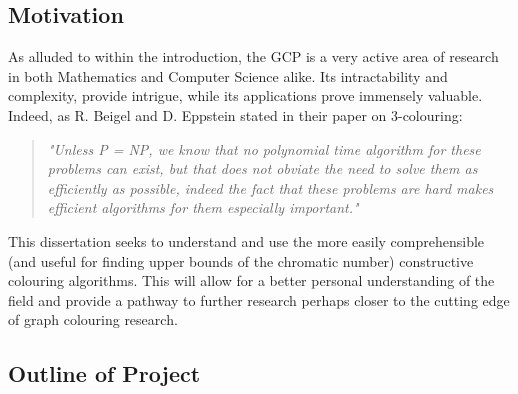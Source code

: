 \subsection{Motivation}
As alluded to within the introduction, the GCP is a very active area of research in both Mathematics and Computer Science alike. Its intractability and complexity, provide intrigue, while its applications prove immensely valuable. Indeed, as R. Beigel and D. Eppstein stated in their paper on 3-colouring: 
\begin{quote}
    \textit{"Unless P = NP, we know that no polynomial time algorithm for these problems can exist, but that does not obviate the need to solve them as efficiently as possible, indeed the fact that these problems are hard makes efficient algorithms for them especially important."}\cite{BEIGEL2005168}
\end{quote}
This dissertation seeks to understand and use the more easily comprehensible (and useful for finding upper bounds of the chromatic number) constructive colouring algorithms. This will allow for a better personal understanding of the field and provide a pathway to further research perhaps closer to the cutting edge of graph colouring research. 

\subsection{Outline of Project}
	
